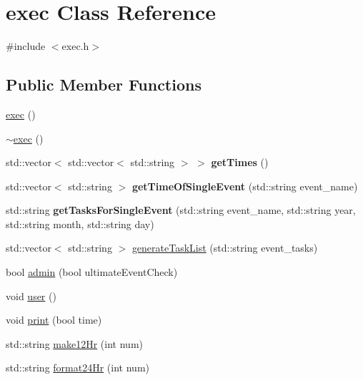 \hypertarget{classexec}{}\section{exec Class Reference}
\label{classexec}


{\ttfamily \#include $<$exec.\+h$>$}

\subsection*{Public Member Functions}
\begin{DoxyCompactItemize}
\item 
\hyperlink{classexec_a2fac94db8f997a01a590c01478662339}{exec} ()
\item 
\hyperlink{classexec_a663a64f17c5431dc01a829f5633e4f56}{$\sim$exec} ()
\item 
\mbox{\label{classexec_a4ca78729a8eabc233fd936948c85565e}} 
std\+::vector$<$ std\+::vector$<$ std\+::string $>$ $>$ {\bfseries get\+Times} ()
\item 
\mbox{\label{classexec_aa81946a7084e58b434cbbb3f41d646af}} 
std\+::vector$<$ std\+::string $>$ {\bfseries get\+Time\+Of\+Single\+Event} (std\+::string event\+\_\+name)
\item 
\mbox{\label{classexec_a82e4d3616bf5ef3790b343de9f255548}} 
std\+::string {\bfseries get\+Tasks\+For\+Single\+Event} (std\+::string event\+\_\+name, std\+::string year, std\+::string month, std\+::string day)
\item 
std\+::vector$<$ std\+::string $>$ \hyperlink{classexec_a056e0f55ae4c4661f7485fe8fc221210}{generate\+Task\+List} (std\+::string event\+\_\+tasks)
\item 
bool \hyperlink{classexec_ab114315e1bb0daff8f96dc03e7c88392}{admin} (bool ultimate\+Event\+Check)
\item 
void \hyperlink{classexec_a924407f4d277807e949aa9e97470f536}{user} ()
\item 
void \hyperlink{classexec_a4cf771a565711689023aa75141f82c52}{print} (bool time)
\item 
std\+::string \hyperlink{classexec_ade14fc20cd40b2d5e3e8e5abbda382d4}{make12\+Hr} (int num)
\item 
std\+::string \hyperlink{classexec_a24a4ca6c8f63a73ed38ddc8e9d015c46}{format24\+Hr} (int num)
\item 

\end{DoxyCompactItemize}
